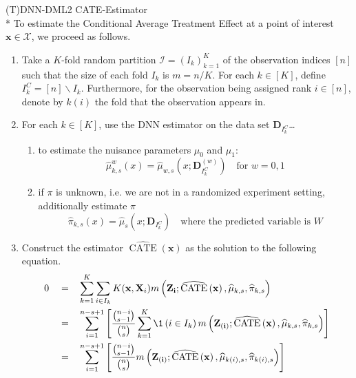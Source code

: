 \begin{boxD}
	\begin{dfn}{(T)DNN-DML2 CATE-Estimator}\label{def:CATE_DNN_DML}\mbox{}\\*
		To estimate the Conditional Average Treatment Effect at a point of interest $\mathbf{x} \in \mathcal{X}$, we proceed as follows.
		\begin{enumerate}
			\item Take a $K$-fold random partition $\mathcal{I} = \left(I_k\right)_{k = 1}^{K}$ of the observation indices $[n]$ such that the size of each fold $I_k$ is $m = n/K$.
			For each $k \in [K]$, define $I_{k}^{C} = [n] \backslash I_k$.
			Furthermore, for the observation being assigned rank $i \in [n]$, denote by $k(i)$ the fold that the observation appears in.
			\item For each $k \in [K]$, use the DNN estimator on the data set $\mathbf{D}_{I_k^C}$\dots
			\begin{enumerate}
				\item to estimate the nuisance parameters $\mu_0$ and $\mu_1$:
				\begin{equation}
					\hat{\mu}_{k,s}^{w}\left(x\right) = \hat{\mu}_{w,s}\left(x; \mathbf{D}_{I_k^{C}}^{(w)}\right) \quad \text{for } w=0,1	
				\end{equation}
				\item if $\pi$ is unknown, i.e. we are not in a randomized experiment setting, additionally estimate $\pi$
				\begin{equation}
					\hat{\pi}_{k,s}\left(x\right) = \hat{\mu}_{s}\left(x; \mathbf{D}_{I_k^{C}}\right) \quad \text{where the predicted variable is $W$}	
				\end{equation}
			\end{enumerate}
			\item Construct the estimator  $\widehat{\operatorname{CATE}}\left(\mathbf{x}\right)$ as the solution to the following equation.
			\begin{equation}
				\begin{aligned}
					0 \quad = \quad & \sum_{k = 1}^{K} \sum_{i \in I_k} K(\mathbf{x}, \mathbf{X}_i) m\left(\mathbf{Z_i}; \widehat{\operatorname{CATE}}\left(\mathbf{x}\right), \hat{\mu}_{k,s}, \hat{\pi}_{k,s}\right)\\
					= \quad & \sum_{i = 1}^{n - s + 1} \left[\frac{\binom{n-i}{s-1}}{\binom{n}{s}} \sum_{k = 1}^{K} \1\left(i \in I_{k}\right)  m\left(\mathbf{Z_{(i)}}; \widehat{\operatorname{CATE}}\left(\mathbf{x}\right), \hat{\mu}_{k,s}, \hat{\pi}_{k,s}\right)\right]\\
					= \quad & \sum_{i = 1}^{n - s + 1} \left[\frac{\binom{n-i}{s-1}}{\binom{n}{s}} m\left(\mathbf{Z_{(i)}}; \widehat{\operatorname{CATE}}\left(\mathbf{x}\right), \hat{\mu}_{k(i),s}, \hat{\pi}_{k(i),s}\right)\right]
				\end{aligned}
			\end{equation}
		\end{enumerate}
	\end{dfn}	
\end{boxD}
